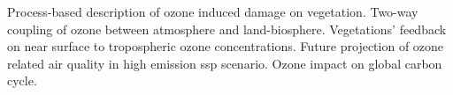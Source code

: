 Process-based description of ozone induced damage on vegetation.
Two-way coupling of ozone between atmosphere and land-biosphere.
Vegetations' feedback on near surface to tropospheric ozone concentrations. 
Future projection of ozone related air quality in high emission \gls{ssp} scenario.
Ozone impact on global carbon cycle.

